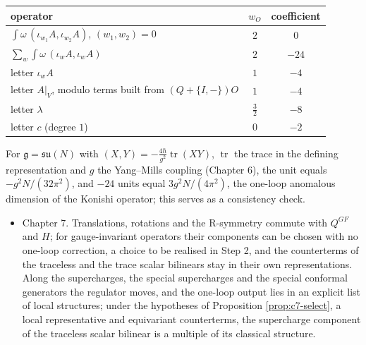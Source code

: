 \begin{tabular}{l|c|c}
operator & $w_O$ & coefficient \\
\hline
$\int\omega\,(\iota_{w_1}A,\iota_{w_2}A)$, $(w_1,w_2)=0$ & $2$ & $0$ \\
$\sum_w\int\omega\,(\iota_wA,\iota_wA)$ & $2$ & $-24$ \\
letter $\iota_wA$ & $1$ & $-4$ \\
letter $A|_V$, modulo terms built from $(Q+\{I,-\})O$ & $1$ & $-4$ \\
letter $\lambda$ & $\tfrac32$ & $-8$ \\
letter $c$ (degree $1$) & $0$ & $-2$ \\
\end{tabular}

For $\mathfrak g=\mathfrak{su}(N)$ with $(X,Y)=-\frac{4\hbar}{g^2}\operatorname{tr}(XY)$, $\operatorname{tr}$ the trace in the defining representation and $g$ the Yang--Mills coupling (Chapter 6), the unit equals $-g^2N/(32\pi^2)$, and $-24$ units equal $3g^2N/(4\pi^2)$, the one-loop anomalous dimension of the Konishi operator; this serves as a consistency check.

\begin{itemize}
\item Chapter 7. Translations, rotations and the R-symmetry commute with $Q^{GF}$ and $H$; for gauge-invariant operators their components can be chosen with no one-loop correction, a choice to be realised in Step 2, and the counterterms of the traceless and the trace scalar bilinears stay in their own representations. Along the supercharges, the special supercharges and the special conformal generators the regulator moves, and the one-loop output lies in an explicit list of local structures; under the hypotheses of Proposition \ref{prop:c7-select}, a local representative and equivariant counterterms, the supercharge component of the traceless scalar bilinear is a multiple of its classical structure.
\end{itemize}
